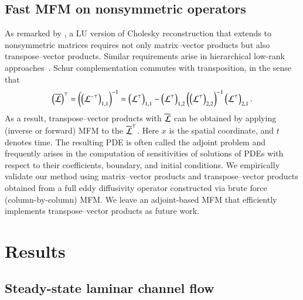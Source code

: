 \subsection{Fast MFM on nonsymmetric operators}\label{s:fmfm}
As remarked by \citet{schaferSparseRecoveryElliptic2021}, a LU version of Cholesky reconstruction that extends to nonsymmetric matrices requires not only matrix--vector products but also transpose--vector products.
Similar requirements arise in hierarchical low-rank approaches~\citep{halko2011finding,lin2011fast}. 
Schur complementation commutes with transposition, in the sense that
\begin{gather}
    \left(\overline{\mathcal{L}}\right)^{\top}
    =
    \left(\left(\mathcal{L}^{-\top}\right)_{1, 1}\right)^{-1}
    =
    \left(\mathcal{L}^{\top}\right)_{1, 1} - \left(\mathcal{L}^{\top}\right)_{1, 2} \left(\left(\mathcal{L}^\top\right)_{2,2}\right)^{-1} \left(\mathcal{L}^\top\right)_{2 ,1} .
    \label{eqn:mfm_schur_transpose}
\end{gather}
As a result, transpose--vector products with $\overline{\mathcal{L}}$ can be obtained by applying (inverse or forward) MFM to the $\overline{\mathcal{L}}^{\top}$.
Here $x$ is the spatial coordinate, and $t$ denotes time.
The resulting PDE is often called the adjoint problem and frequently arises in the computation of sensitivities of solutions of PDEs with respect to their coefficients, boundary, and initial conditions.
We empirically validate our method using matrix--vector products and transpose--vector products obtained from a full eddy diffusivity operator constructed via brute force (column-by-column) MFM. 
We leave an adjoint-based MFM that efficiently implements transpose--vector products as future work.

\section{Results}\label{s:results}

\subsection{Steady-state laminar channel flow}

